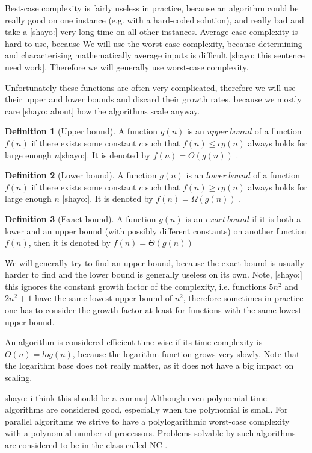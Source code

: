 \documentclass{report}
\theoremstyle{plain}
\theoremstyle{definition}
\newtheorem{definition}{Definition}
\theoremstyle{remark}
\numberwithin{definition}{chapter}
\numberwithin{example}{chapter}
\numberwithin{figure}{chapter}
\begin{document}
{Best-case complexity is fairly useless in practice, because an algorithm could be really good on one instance (e.g. with a hard-coded solution), and really bad and take a [shayo:] very long time on all other instances. Average-case complexity is hard to use, because 
We will use the worst-case complexity, because determining and characterising mathematically average inputs is difficult [shayo: this sentence need work]. Therefore we will generally use worst-case complexity.

Unfortunately these functions are often very complicated, therefore we will use their upper and lower bounds and discard their growth rates, because we mostly care [shayo: about] how the algorithms scale anyway.

\begin{definition}[Upper bound]
A function $g(n)$ is an $upper \ bound$ of a function $f(n)$ if there exists some constant $c$ such that $f(n)\leq cg(n)$ always holds for large enough $n$[shayo:]. It is denoted by $f(n) = O(g(n))$ \cite{skiena504algorithm}.
\end{definition}

\begin{definition}[Lower bound]
A function $g(n)$ is an $lower \ bound$ of a function $f(n)$ if there exists some constant $c$ such that $f(n)\geq cg(n)$ always holds for large enough $n$ [shayo:]. It is denoted by $f(n) = \Omega(g(n))$ \cite{skiena504algorithm}.
\end{definition}

\begin{definition}[Exact bound]
A function $g(n)$ is an $exact \ bound$ if it is both a lower and an upper bound (with possibly different constants) on another function $f(n)$, then it is denoted by $f(n) = \Theta(g(n))$
\end{definition}

We will generally try to find an upper bound, because the exact bound is usually harder to find and the lower bound is generally useless on its own. Note, [shayo:] this ignores the constant growth factor of the complexity, i.e. functions $5n^2$ and $2n^2+1$ have the same lowest upper bound of $n^2$, therefore sometimes in practice one has to consider the growth factor at least for functions with the same lowest upper bound.

An algorithm is considered efficient time wise if its time complexity is $O(n)=log(n)$, because the logarithm function grows very slowly. Note that the logarithm base does not really matter, as it does not have a big impact on scaling.{shayo: i think this should be a comma] Although even polynomial time algorithms are considered good, especially when the polynomial is small. For parallel algorithms we strive to have a polylogarithmic worst-case complexity with a polynomial number of processors. Problems solvable by such algorithms are considered to be in the class called NC \cite{berman1996fundamentals}.

}}
\end{document}
